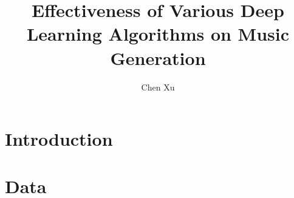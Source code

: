 \documentclass{article}
\begin{document}
\author{Chen Xu}
\title{Effectiveness of Various Deep Learning Algorithms on Music Generation}
\maketitle

\section{Introduction}


\section{Data}
\end{document}
